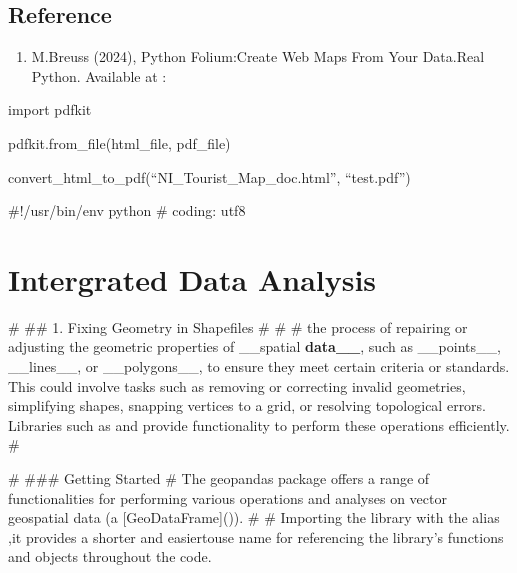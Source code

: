 \documentclass[letterpaper,10pt,english]{sphinxmanual}
\begin{document}
\section{Reference}
\label{\detokenize{egm722_serenee/NI_Tourist_Map_doc:reference}}\begin{enumerate}
%
\item {} 
\sphinxAtStartPar
M.Breuss (2024), Python Folium:Create Web Maps From Your Data.Real Python. Available at :

\end{enumerate}

\sphinxAtStartPar
import pdfkit
\begin{description}
\sphinxAtStartPar
pdfkit.from\_file(html\_file, pdf\_file)

\sphinxAtStartPar
convert\_html\_to\_pdf(“NI\_Tourist\_Map\_doc.html”, “test.pdf”)

\end{description}

\sphinxstepscope

\sphinxAtStartPar
\#!/usr/bin/env python
\# coding: utf\sphinxhyphen{}8


\chapter{Intergrated Data Analysis}
\label{\detokenize{egm722_serenee/Integrated_Data_Analysis_doc:intergrated-data-analysis}}\label{\detokenize{egm722_serenee/Integrated_Data_Analysis_doc::doc}}
\sphinxAtStartPar
\# \#\# 1. Fixing Geometry in Shapefiles \#
\#
\# the process of repairing or adjusting the geometric properties of \_\_spatial {\color{red}\bfseries{}data\_\_}, such as \_\_points\_\_, \_\_lines\_\_, or \_\_polygons\_\_, to ensure they meet certain criteria or standards. This could involve tasks such as removing or correcting invalid geometries, simplifying shapes, snapping vertices to a grid, or resolving topological errors. Libraries such as  and  provide functionality to perform these operations efficiently.
\#

\sphinxAtStartPar
\# \#\#\# Getting Started
\# The geopandas package offers a range of functionalities for performing various operations and analyses on vector geospatial data (a {[}GeoDataFrame{]}()).
\#
\# Importing the  library with the alias  ,it provides a shorter and easier\sphinxhyphen{}to\sphinxhyphen{}use name for referencing the library’s functions and objects throughout the code.
\end{document}
